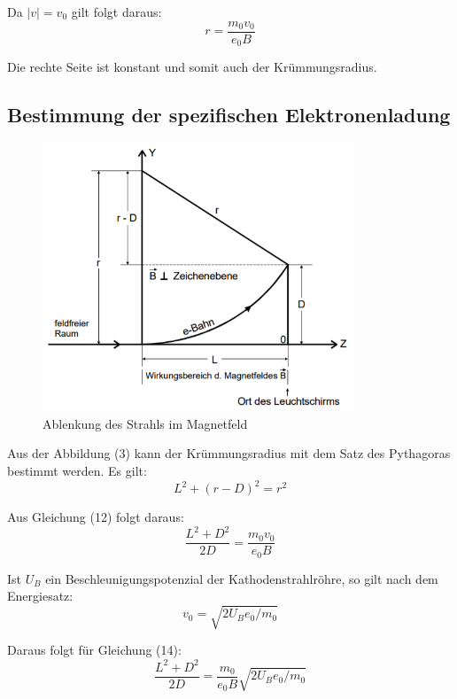 Da $|v| = v_0$ gilt folgt daraus:
\begin{equation}
  r = \frac{m_0 v_0}{e_0 B}
\end{equation}

Die rechte Seite ist konstant und somit auch der Krümmungsradius.


\subsection{Bestimmung der spezifischen Elektronenladung}

\begin{figure}[H]
  \centering
  \includegraphics[height=8cm]{ablenkungbfeld.PNG}
  \caption{Ablenkung des Strahls im Magnetfeld}
  \label{fig:ablenkungbfeld}
\end{figure}

Aus der Abbildung (3) kann der Krümmungsradius mit dem Satz des Pythagoras bestimmt werden.
Es gilt:
\begin{equation}
  L^2 + (r - D)^2 = r^2
\end{equation}

Aus Gleichung (12) folgt daraus:
\begin{equation}
  \frac{L^2 + D^2}{2D} = \frac{m_0 v_0}{e_0 B}
\end{equation}

Ist $U_B$ ein Beschleunigungspotenzial der Kathodenstrahlröhre, so gilt nach dem Energiesatz:
\begin{equation}
  v_0 = \sqrt{2U_B e_0/m_0}
\end{equation}

Daraus folgt für Gleichung (14):
\begin{equation}
  \frac{L^2 + D^2}{2D} = \frac{m_0}{e_0 B} \sqrt{2U_B e_0/m_0}
\end{equation}

